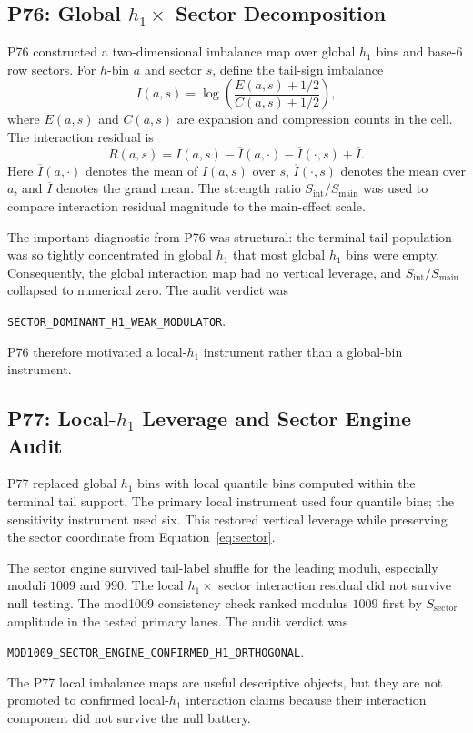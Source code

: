 \documentclass[11pt]{article}
\newcommand{\Ssector}{S_{\mathrm{sector}}}
\newcommand{\Sint}{S_{\mathrm{int}}}
\newcommand{\Smain}{S_{\mathrm{main}}}
\begin{document}
\subsection{P76: Global $h_1 \times$ Sector Decomposition}

P76 constructed a two-dimensional imbalance map over global $h_1$ bins
and base-6 row sectors. For $h$-bin $a$ and sector $s$, define the
tail-sign imbalance
\begin{equation}
    I(a,s) = \log\!\left(\frac{E(a,s)+1/2}{C(a,s)+1/2}\right),
    \label{eq:imbalance}
\end{equation}
where $E(a,s)$ and $C(a,s)$ are expansion and compression counts in
the cell. The interaction residual is
\begin{equation}
    R(a,s) = I(a,s)
           - \overline{I}(a,\cdot)
           - \overline{I}(\cdot,s)
           + \overline{I}.
    \label{eq:interaction_residual}
\end{equation}
Here $\overline{I}(a,\cdot)$ denotes the mean of $I(a,s)$ over $s$,
$\overline{I}(\cdot,s)$ denotes the mean over $a$, and $\overline{I}$
denotes the grand mean. The strength ratio $\Sint/\Smain$ was used to
compare interaction residual magnitude to the main-effect scale.

The important diagnostic from P76 was structural: the terminal tail
population was so tightly concentrated in global $h_1$ that most global
$h_1$ bins were empty. Consequently, the global interaction map had no
vertical leverage, and $\Sint/\Smain$ collapsed to numerical zero. The
audit verdict was
\begin{center}
\texttt{SECTOR\_DOMINANT\_H1\_WEAK\_MODULATOR}.
\end{center}
P76 therefore motivated a local-$h_1$ instrument rather than a
global-bin instrument.

\subsection{P77: Local-$h_1$ Leverage and Sector Engine Audit}

P77 replaced global $h_1$ bins with local quantile bins computed within
the terminal tail support. The primary local instrument used four
quantile bins; the sensitivity instrument used six. This restored
vertical leverage while preserving the sector coordinate from
Equation~\eqref{eq:sector}.

The sector engine survived tail-label shuffle for the leading moduli,
especially moduli $1009$ and $990$. The local $h_1 \times$ sector
interaction residual did not survive null testing. The mod1009
consistency check ranked modulus $1009$ first by $\Ssector$ amplitude
in the tested primary lanes. The audit verdict was
\begin{center}
\texttt{MOD1009\_SECTOR\_ENGINE\_CONFIRMED\_H1\_ORTHOGONAL}.
\end{center}
The P77 local imbalance maps are useful descriptive objects, but they
are not promoted to confirmed local-$h_1$ interaction claims because
their interaction component did not survive the null battery.
\end{document}
